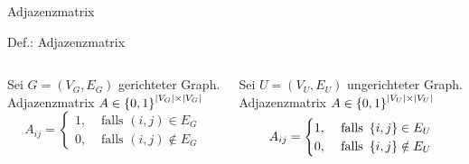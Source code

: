 \begin{frame}{Adjazenzmatrix}
	\begin{block}{Def.: Adjazenzmatrix}
		\begin{columns}
			\begin{column}{0.475\textwidth}
				Sei $G=(V_G,E_G)$ gerichteter Graph.\\
				Adjazenzmatrix $A \in \left\{ 0,1 \right\}^{\mid V_G \mid \times \mid V_G \mid}$\\[12pt]
				\[
					A_{ij} = 
					\begin{cases}
						1, & \text{ falls } (i,j)\in E_G\\
						0, & \text{ falls } (i,j)\notin E_G
					\end{cases}
				\]
			\end{column}
			\begin{column}{0.475\textwidth}
				Sei $U=(V_U,E_U)$ ungerichteter Graph.\\
				Adjazenzmatrix $A \in \left\{ 0,1 \right\}^{\mid V_U \mid \times \mid V_U \mid}$\\[12pt]
				\[
					A_{ij} = 
					\begin{cases}
						1, & \text{ falls } \left\{ i,j \right\}\in E_U\\
						0, & \text{ falls } \left\{ i,j \right\}\notin E_U
					\end{cases}
				\]
			\end{column}
		\end{columns}
	\end{block}
\end{frame}

